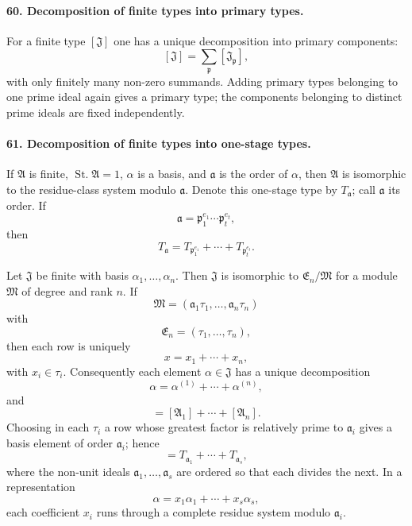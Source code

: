 \documentclass[11pt]{article}
\newcommand{\St}{\operatorname{St.}}
\begin{document}
\paragraph{60. Decomposition of finite types into primary types.}
For a finite type $[\mathfrak J]$ one has a unique decomposition into primary components:
\[
  [\mathfrak J]=\sum_{\mathfrak p}[\mathfrak J_{\mathfrak p}],
\]
with only finitely many non-zero summands. Adding primary types belonging to one prime ideal again gives a primary type; the components belonging to distinct prime ideals are fixed independently.

\paragraph{61. Decomposition of finite types into one-stage types.}
If $\mathfrak A$ is finite, $\St\mathfrak A=1$, $\alpha$ is a basis, and $\mathfrak a$ is the order of $\alpha$, then $\mathfrak A$ is isomorphic to the residue-class system modulo $\mathfrak a$. Denote this one-stage type by $T_{\mathfrak a}$; call $\mathfrak a$ its order. If
\[
  \mathfrak a=\mathfrak p_1^{e_1}\cdots\mathfrak p_t^{e_t},
\]
then
\[
  T_{\mathfrak a}=T_{\mathfrak p_1^{e_1}}+\cdots+T_{\mathfrak p_t^{e_t}}.
\]

Let $\mathfrak J$ be finite with basis $\alpha_1,
\ldots,
\alpha_n$. Then $\mathfrak J$ is isomorphic to $\mathfrak E_n/\mathfrak M$ for a module $\mathfrak M$ of degree and rank $n$. If
\begin{equation}
  \mathfrak M=(\mathfrak a_1\tau_1,
  \ldots,
  \mathfrak a_n\tau_n)
\tag{106}
\end{equation}
with
\begin{equation}
  \mathfrak E_n=(\tau_1,
  \ldots,
  \tau_n),
\tag{107}
\end{equation}
then each row is uniquely
\begin{equation}
  x=x_1+\cdots+x_n,
\tag{108}
\end{equation}
with $x_i\in\tau_i$. Consequently each element $\alpha\in\mathfrak J$ has a unique decomposition
\begin{equation}
  \alpha=\alpha^{(1)}+\cdots+\alpha^{(n)},
\tag{109}
\end{equation}
and
\begin{equation}
  [\mathfrak J]=[\mathfrak A_1]+\cdots+[\mathfrak A_n].
\tag{110}
\end{equation}
Choosing in each $\tau_i$ a row whose greatest factor is relatively prime to $\mathfrak a_i$ gives a basis element of order $\mathfrak a_i$; hence
\begin{equation}
  [\mathfrak J]=T_{\mathfrak a_1}+\cdots+T_{\mathfrak a_s},
\tag{111}
\end{equation}
where the non-unit ideals $\mathfrak a_1,
\ldots,
\mathfrak a_s$ are ordered so that each divides the next. In a representation
\begin{equation}
  \alpha=x_1\alpha_1+\cdots+x_s\alpha_s,
\tag{112}
\end{equation}
each coefficient $x_i$ runs through a complete residue system modulo $\mathfrak a_i$.
\end{document}
